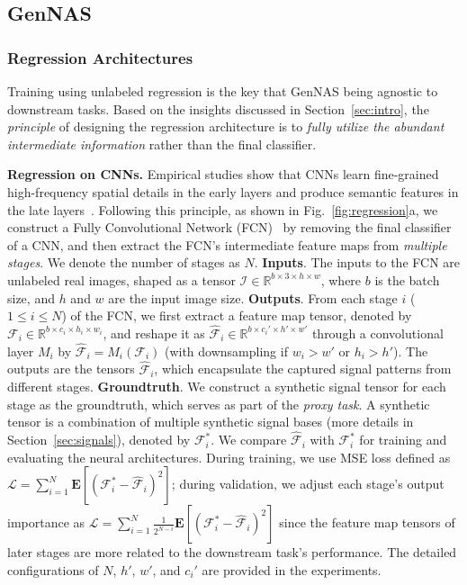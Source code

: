 \documentclass{article}
\begin{document}
\subsection{GenNAS} \label{sec:genNAS}

\subsubsection{Regression Architectures} 
\label{sec:regression_arch}

Training using unlabeled regression is the key that GenNAS being agnostic to downstream tasks.
Based on the insights discussed in Section~\ref{sec:intro}, the \textit{principle} of designing the regression architecture is to \textit{fully utilize the abundant intermediate information} rather than the final classifier.


\textbf{Regression on CNNs.}
Empirical studies show that CNNs learn fine-grained high-frequency spatial details in the early layers and produce semantic features in the late layers~\cite{wang2020high}. 
Following this principle, as shown in Fig.~\ref{fig:regression}a,
we construct a Fully Convolutional Network (FCN)~\cite{long2015fully} by removing the final classifier of a CNN, and then extract the FCN's intermediate feature maps from \textit{multiple stages}.
We denote the number of stages as $N$.
\textbf{Inputs}. The inputs to the FCN are unlabeled real images, shaped as a tensor $\mathcal{I}\in\mathbb{R}^{b\times 3 \times h \times w}$, where $b$ is the batch size, and $h$ and $w$ are the input image size.
\textbf{Outputs}. From each stage $i$ ($1\leq i \leq N$) of the FCN, we first extract a feature map tensor, denoted by $\mathcal{F}_i \in \mathbb{R}^{b \times c_i \times h_i \times w_i}$,
and reshape it as $\hat{\mathcal{F}}_i \in \mathbb{R}^{b\times c_i' \times h' \times w'}$ through a convolutional layer $M_i$ by $\hat{\mathcal{F}}_i = M_i({\mathcal{F}}_{i})$ (with downsampling if $w_i>w'$ or $h_i>h'$).
The outputs are the tensors $\hat{\mathcal{F}}_i$, which encapsulate the captured signal patterns from different stages.
\textbf{Groundtruth}. We construct a synthetic signal tensor for each stage as the groundtruth, which serves as part of the \textit{proxy task}. A synthetic tensor is a combination of multiple synthetic signal bases (more details in Section~\ref{sec:signals}), denoted by $\mathcal{F}_i^*$.
We compare $\hat{\mathcal{F}}_i$ with $\mathcal{F}_i^*$ for training and evaluating the neural architectures.
During training, we use MSE loss defined as $\mathcal{L} = \sum^{N}_{i=1}\textbf{E}[(\mathcal{F}^*_i -\hat{\mathcal{F}}_i)^2]$;
during validation, we adjust each stage's output importance as $\mathcal{L} = \sum^{N}_{i=1} \frac{1}{2^{N-i}} \textbf{E}[(\mathcal{F}^*_i -\hat{\mathcal{F}}_i)^2]$ since the feature map tensors of later stages are more related to the downstream task's performance.
The detailed configurations of $N$, $h'$, $w'$, and $c_i'$ are provided in the experiments.
\end{document}
